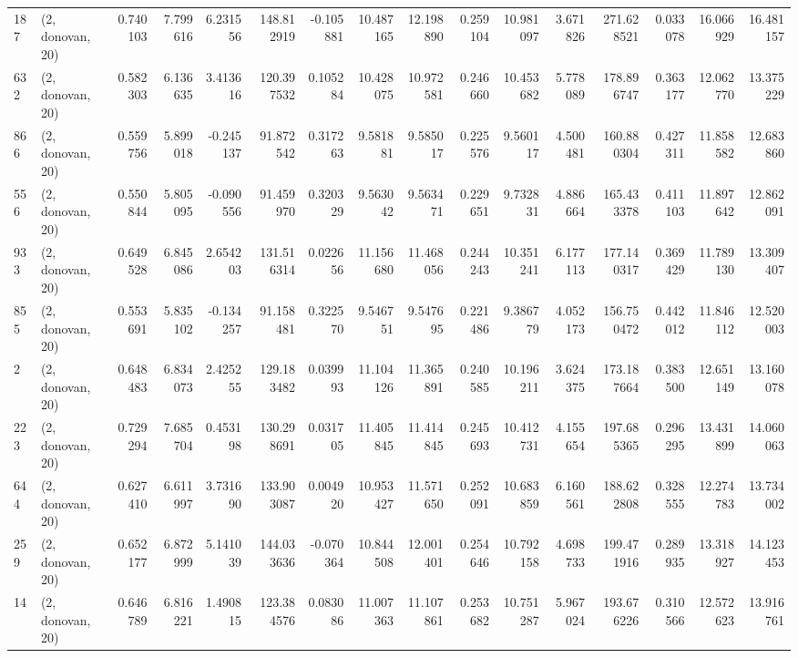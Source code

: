 \begin{tabular}{llrrrrrrrrrrrrrr}
187  &  (2, donovan, 20) &   0.740103 &   7.799616 &   6.231556 &    148.812919 &   -0.105881 &   10.487165 &   12.198890 &  0.259104 &  10.981097 &   3.671826 &   271.628521 &   0.033078 &  16.066929 &  16.481157 \\
632  &  (2, donovan, 20) &   0.582303 &   6.136635 &   3.413616 &    120.397532 &    0.105284 &   10.428075 &   10.972581 &  0.246660 &  10.453682 &   5.778089 &   178.896747 &   0.363177 &  12.062770 &  13.375229 \\
866  &  (2, donovan, 20) &   0.559756 &   5.899018 &  -0.245137 &     91.872542 &    0.317263 &    9.581881 &    9.585017 &  0.225576 &   9.560117 &   4.500481 &   160.880304 &   0.427311 &  11.858582 &  12.683860 \\
556  &  (2, donovan, 20) &   0.550844 &   5.805095 &  -0.090556 &     91.459970 &    0.320329 &    9.563042 &    9.563471 &  0.229651 &   9.732831 &   4.886664 &   165.433378 &   0.411103 &  11.897642 &  12.862091 \\
933  &  (2, donovan, 20) &   0.649528 &   6.845086 &   2.654203 &    131.516314 &    0.022656 &   11.156680 &   11.468056 &  0.244243 &  10.351241 &   6.177113 &   177.140317 &   0.369429 &  11.789130 &  13.309407 \\
855  &  (2, donovan, 20) &   0.553691 &   5.835102 &  -0.134257 &     91.158481 &    0.322570 &    9.546751 &    9.547695 &  0.221486 &   9.386779 &   4.052173 &   156.750472 &   0.442012 &  11.846112 &  12.520003 \\
2    &  (2, donovan, 20) &   0.648483 &   6.834073 &   2.425255 &    129.183482 &    0.039993 &   11.104126 &   11.365891 &  0.240585 &  10.196211 &   3.624375 &   173.187664 &   0.383500 &  12.651149 &  13.160078 \\
223  &  (2, donovan, 20) &   0.729294 &   7.685704 &   0.453198 &    130.298691 &    0.031705 &   11.405845 &   11.414845 &  0.245693 &  10.412731 &   4.155654 &   197.685365 &   0.296295 &  13.431899 &  14.060063 \\
644  &  (2, donovan, 20) &   0.627410 &   6.611997 &   3.731690 &    133.903087 &    0.004920 &   10.953427 &   11.571650 &  0.252091 &  10.683859 &   6.160561 &   188.622808 &   0.328555 &  12.274783 &  13.734002 \\
259  &  (2, donovan, 20) &   0.652177 &   6.872999 &   5.141039 &    144.033636 &   -0.070364 &   10.844508 &   12.001401 &  0.254646 &  10.792158 &   4.698733 &   199.471916 &   0.289935 &  13.318927 &  14.123453 \\
14   &  (2, donovan, 20) &   0.646789 &   6.816221 &   1.490815 &    123.384576 &    0.083086 &   11.007363 &   11.107861 &  0.253682 &  10.751287 &   5.967024 &   193.676226 &   0.310566 &  12.572623 &  13.916761 \\

\end{tabular}
